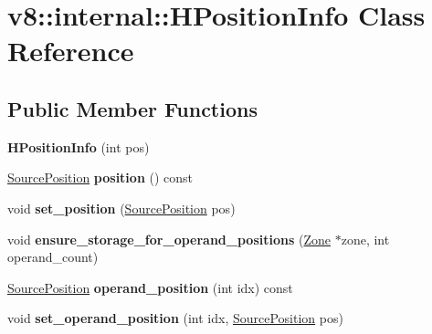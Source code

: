 \hypertarget{classv8_1_1internal_1_1_h_position_info}{}\section{v8\+:\+:internal\+:\+:H\+Position\+Info Class Reference}
\label{classv8_1_1internal_1_1_h_position_info}
\subsection*{Public Member Functions}
\begin{DoxyCompactItemize}
\item 
{\bfseries H\+Position\+Info} (int pos)\hypertarget{classv8_1_1internal_1_1_h_position_info_a825a7e9d2f7c56d4a5dc349f8d4dd99e}{}\label{classv8_1_1internal_1_1_h_position_info_a825a7e9d2f7c56d4a5dc349f8d4dd99e}

\item 
\hyperlink{classv8_1_1internal_1_1_source_position}{Source\+Position} {\bfseries position} () const \hypertarget{classv8_1_1internal_1_1_h_position_info_a890fb4e52ba6747727b77c2004f2006f}{}\label{classv8_1_1internal_1_1_h_position_info_a890fb4e52ba6747727b77c2004f2006f}

\item 
void {\bfseries set\+\_\+position} (\hyperlink{classv8_1_1internal_1_1_source_position}{Source\+Position} pos)\hypertarget{classv8_1_1internal_1_1_h_position_info_a6e5b214f671b21efc0ac59db3f745888}{}\label{classv8_1_1internal_1_1_h_position_info_a6e5b214f671b21efc0ac59db3f745888}

\item 
void {\bfseries ensure\+\_\+storage\+\_\+for\+\_\+operand\+\_\+positions} (\hyperlink{classv8_1_1internal_1_1_zone}{Zone} $\ast$zone, int operand\+\_\+count)\hypertarget{classv8_1_1internal_1_1_h_position_info_a95f12e935243315b0f34298b9826b473}{}\label{classv8_1_1internal_1_1_h_position_info_a95f12e935243315b0f34298b9826b473}

\item 
\hyperlink{classv8_1_1internal_1_1_source_position}{Source\+Position} {\bfseries operand\+\_\+position} (int idx) const \hypertarget{classv8_1_1internal_1_1_h_position_info_ae6ba25078c8b460c0fba04033660dbf2}{}\label{classv8_1_1internal_1_1_h_position_info_ae6ba25078c8b460c0fba04033660dbf2}

\item 
void {\bfseries set\+\_\+operand\+\_\+position} (int idx, \hyperlink{classv8_1_1internal_1_1_source_position}{Source\+Position} pos)\hypertarget{classv8_1_1internal_1_1_h_position_info_adde3d7a929c0616abe42457f6f528d3b}{}\label{classv8_1_1internal_1_1_h_position_info_adde3d7a929c0616abe42457f6f528d3b}

\end{DoxyCompactItemize}
